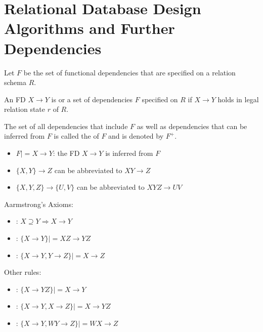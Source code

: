 \chapter{Relational Database Design Algorithms and Further Dependencies}

    \par Let $F$ be the set of functional dependencies that are specified on a relation schema $R$.

      \par An FD $X \to Y$ is  or  a set of dependencies $F$ specified on $R$ if $X \to Y$ holds in  legal relation state $r$ of $R$.

      \par The set of all dependencies that include $F$ as well as dependencies that can be inferred from $F$ is called the  of $F$ and is denoted by $F^{+}$.

      \begin{itemize}
        \item $F |= X \to Y$: the FD $X \to Y$ is inferred from $F$
        \item $\{X, Y\} \to Z$ can be abbreviated to $XY \to Z$
        \item $\{X, Y, Z\} \to \{U, V\}$ can be abbreviated to $XYZ \to UV$
      \end{itemize}

      \par Aarmstrong's Axioms:
      \begin{itemize}
        \item {}:
          $X \supseteq Y \Rightarrow X \to Y$
        \item {}:
          $\{ X \to Y \} |= XZ \to YZ$
        \item {}:
          $\{ X \to Y, Y \to Z \} |= X \to Z$
      \end{itemize}
      \par Other rules:
      \begin{itemize}
        \item {}:
          $\{ X \to YZ \} |= X \to Y$
        \item {}:
          $\{ X \to Y, X \to Z \} |= X \to YZ$
        \item {}:
          $\{ X \to Y, WY \to Z \} |= WX \to Z$
      \end{itemize}

